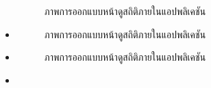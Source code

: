 \documentclass[12pt,oneside,openright,a4paper]{cpe-thai-project}
\begin{document}
\begin{itemize}
\begin{figure}[!ht]
    \caption{ภาพการออกแบบหน้าดูสถิติภายในแอปพลิเคชัน}\label{fig:system}
  \end{figure}
 \item   \begin{figure}[!ht]\centering
    \setlength{\fboxrule}{0.2mm} %
    \setlength{\fboxsep}{1cm}
    \caption{ภาพการออกแบบหน้าดูสถิติภายในแอปพลิเคชัน}\label{fig:system}
  \end{figure}          
 \item   \begin{figure}[!ht]\centering
    \setlength{\fboxrule}{0.2mm} %
    \setlength{\fboxsep}{1cm}
    \caption{ภาพการออกแบบหน้าดูสถิติภายในแอปพลิเคชัน}\label{fig:system}
  \end{figure}
 \item   \begin{figure}[!ht]\centering
    \setlength{\fboxrule}{0.2mm} %
    \setlength{\fboxsep}{1cm}

\end{figure}
\end{itemize}
\end{document}
